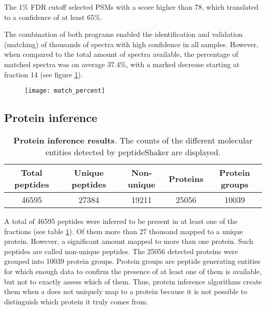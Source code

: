  The 1\% FDR cutoff selected PSMs with a score higher than 78, which translated to a confidence of at least 65\%.


The combination of both programs enabled the identification and validation (matching) of thousands of spectra with high confidence in all samples. However, when compared to the total amount of spectra available, the percentage of matched spectra was on average 37.4\%, with a marked decrease starting at fraction 14 (see figure \ref{fig:match_percent}).

\begin{figure}[!h]
\texttt{[image: match\_percent]}
\label{fig:match_percent}
\end{figure}

\subsection{Protein inference}

\begin{table}[H]
\begin{tabular}{ccccc}
  \toprule
 Total peptides & Unique peptides & Non-unique & Proteins & Protein groups \\ 
  \midrule
 46595 & 27384 & 19211 & 25056 & 10039 \\
 \bottomrule
\end{tabular}
\caption{\textbf{Protein inference results}. The counts of the different molecular entities detected by peptideShaker are displayed.}
\label{tab:protein_inference}
\end{table}

A total of 46595 peptides were inferred to be present in at least one of the fractions (see table \ref{tab:protein_inference}). Of them more than 27 thousand mapped to a unique protein. However, a significant amount mapped to more than one protein. Such peptides are called non-unique peptides. The 25056 detected proteins were grouped into 10039 protein groups. Protein groups are peptide generating entities for which enough data to confirm the presence of at least one of them is available, but not to exactly assess which of them. Thus, protein inference algorithms create them when a does not uniquely map to a protein because it is not possible to distinguish which protein it truly comes from.


